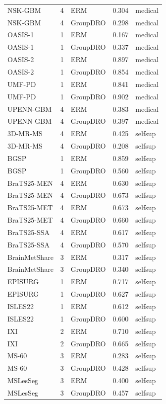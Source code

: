 \begin{tabular}{lrlrl}
NSK-GBM & 4 & ERM & 0.304 & medical \\
NSK-GBM & 4 & GroupDRO & 0.298 & medical \\
OASIS-1 & 1 & ERM & 0.167 & medical \\
OASIS-1 & 1 & GroupDRO & 0.337 & medical \\
OASIS-2 & 1 & ERM & 0.897 & medical \\
OASIS-2 & 1 & GroupDRO & 0.854 & medical \\
UMF-PD & 1 & ERM & 0.841 & medical \\
UMF-PD & 1 & GroupDRO & 0.902 & medical \\
UPENN-GBM & 4 & ERM & 0.383 & medical \\
UPENN-GBM & 4 & GroupDRO & 0.397 & medical \\
3D-MR-MS & 4 & ERM & 0.425 & selfsup \\
3D-MR-MS & 4 & GroupDRO & 0.208 & selfsup \\
BGSP & 1 & ERM & 0.859 & selfsup \\
BGSP & 1 & GroupDRO & 0.560 & selfsup \\
BraTS25-MEN & 4 & ERM & 0.630 & selfsup \\
BraTS25-MEN & 4 & GroupDRO & 0.673 & selfsup \\
BraTS25-MET & 4 & ERM & 0.673 & selfsup \\
BraTS25-MET & 4 & GroupDRO & 0.660 & selfsup \\
BraTS25-SSA & 4 & ERM & 0.617 & selfsup \\
BraTS25-SSA & 4 & GroupDRO & 0.570 & selfsup \\
BrainMetShare & 3 & ERM & 0.317 & selfsup \\
BrainMetShare & 3 & GroupDRO & 0.340 & selfsup \\
EPISURG & 1 & ERM & 0.717 & selfsup \\
EPISURG & 1 & GroupDRO & 0.627 & selfsup \\
ISLES22 & 1 & ERM & 0.612 & selfsup \\
ISLES22 & 1 & GroupDRO & 0.600 & selfsup \\
IXI & 2 & ERM & 0.710 & selfsup \\
IXI & 2 & GroupDRO & 0.665 & selfsup \\
MS-60 & 3 & ERM & 0.283 & selfsup \\
MS-60 & 3 & GroupDRO & 0.428 & selfsup \\
MSLesSeg & 3 & ERM & 0.400 & selfsup \\
MSLesSeg & 3 & GroupDRO & 0.457 & selfsup \\

\end{tabular}

